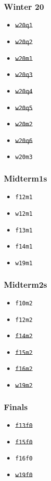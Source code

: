 \def\width{0.24}
\begin{minipage}[t]{\width\textwidth}
    \subsubsection*{Winter 20}
    \begin{itemize}
        \item \st{\texttt{w20q1}}
        \item \st{\texttt{w20q2}}
        \item \st{\texttt{w20m1}}
        \item \st{\texttt{w20q3}}
        \item \st{\texttt{w20q4}}
        \item \st{\texttt{w20q5}}
        \item \st{\texttt{w20m2}}
        \item \st{\texttt{w20q6}}
        \item \texttt{w20m3}
    \end{itemize}
\end{minipage}
\begin{minipage}[t]{\width\textwidth}
    \subsubsection*{Midterm1s}
    \begin{itemize}
        \item \texttt{f12m1}
        \item \texttt{w12m1}
        \item \texttt{f13m1}
        \item \texttt{f14m1}
        \item \texttt{w19m1}
    \end{itemize}    
\end{minipage}
\begin{minipage}[t]{\width\textwidth}
    \subsubsection*{Midterm2s}
    \begin{itemize}
        \item \texttt{f10m2}
        \item \texttt{f12m2}
        \item \st{\texttt{f14m2}}
        \item \st{\texttt{f15m2}}
        \item \st{\texttt{f16m2}}
        \item \st{\texttt{w19m2}}
    \end{itemize}    
\end{minipage}
\begin{minipage}[t]{\width\textwidth}
    \subsubsection*{Finals}
    \begin{itemize}
        \item \st{\texttt{f13f0}}
        \item \st{\texttt{f15f0}}
        \item \texttt{f16f0}
        \item \st{\texttt{w19f0}}
    \end{itemize}
\end{minipage}